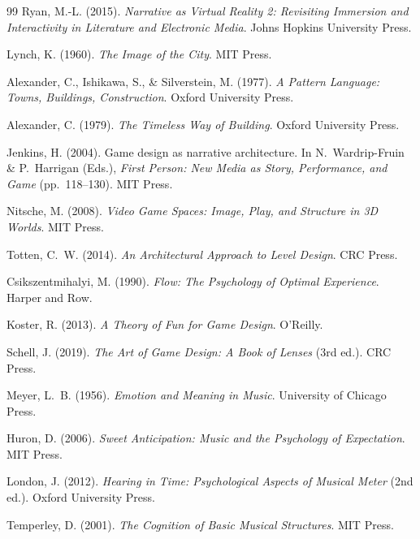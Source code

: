 \documentclass[12pt, a4paper]{article}
\theoremstyle{plain}
\theoremstyle{definition}
\theoremstyle{remark}
\begin{document}
\begin{thebibliography}{99}
Ryan, M.-L. (2015).
\textit{Narrative as Virtual Reality 2: Revisiting
Immersion and Interactivity in Literature and Electronic
Media}.
Johns Hopkins University Press.


Lynch, K. (1960).
\textit{The Image of the City}.
MIT Press.

Alexander, C., Ishikawa, S., \& Silverstein, M. (1977).
\textit{A Pattern Language: Towns, Buildings, Construction}.
Oxford University Press.

Alexander, C. (1979).
\textit{The Timeless Way of Building}.
Oxford University Press.


Jenkins, H. (2004).
Game design as narrative architecture.
In N.~Wardrip-Fruin \& P.~Harrigan (Eds.),
\textit{First Person: New Media as Story, Performance, and
Game} (pp.~118--130).
MIT Press.

Nitsche, M. (2008).
\textit{Video Game Spaces: Image, Play, and Structure in 3D
Worlds}.
MIT Press.

Totten, C.~W. (2014).
\textit{An Architectural Approach to Level Design}.
CRC Press.

Csikszentmihalyi, M. (1990).
\textit{Flow: The Psychology of Optimal Experience}.
Harper and Row.

Koster, R. (2013).
\textit{A Theory of Fun for Game Design}.
O'Reilly.

Schell, J. (2019).
\textit{The Art of Game Design: A Book of Lenses}
(3rd ed.).
CRC Press.


Meyer, L.~B. (1956).
\textit{Emotion and Meaning in Music}.
University of Chicago Press.

Huron, D. (2006).
\textit{Sweet Anticipation: Music and the Psychology of
Expectation}.
MIT Press.

London, J. (2012).
\textit{Hearing in Time: Psychological Aspects of Musical
Meter} (2nd ed.).
Oxford University Press.

Temperley, D. (2001).
\textit{The Cognition of Basic Musical Structures}.
MIT Press.


\end{thebibliography}
\end{document}
